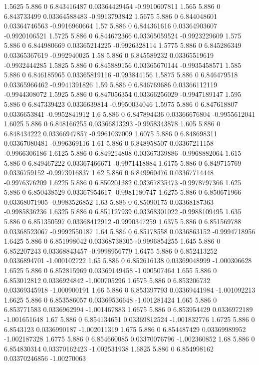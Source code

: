 {1.5625 5.886 0 6.843416487 0.03364429454 -0.9910607811
1.565 5.886 0 6.843733499 0.03364588483 -0.9913793842
1.5675 5.886 0 6.844048601 0.03364746563 -0.9916960664
1.57 5.886 0 6.844361616 0.03364903607 -0.9920106521
1.5725 5.886 0 6.844672366 0.03365059524 -0.9923229609
1.575 5.886 0 6.844980669 0.03365214225 -0.9926328114
1.5775 5.886 0 6.845286349 0.03365367619 -0.992940025
1.58 5.886 0 6.845589232 0.03365519619 -0.9932444285
1.5825 5.886 0 6.845889156 0.03365670144 -0.9935458571
1.585 5.886 0 6.846185965 0.03365819116 -0.993844156
1.5875 5.886 0 6.846479518 0.03365966462 -0.9941391826
1.59 5.886 0 6.846769686 0.03366112119 -0.9944308072
1.5925 5.886 0 6.847056354 0.03366256029 -0.9947189147
1.595 5.886 0 6.847339423 0.0336639814 -0.9950034046
1.5975 5.886 0 6.847618807 0.0336653841 -0.9952841912
1.6 5.886 0 6.847894436 0.03366676804 -0.9955612041
1.6025 5.886 0 6.848166255 0.03366813293 -0.9958343878
1.605 5.886 0 6.848434222 0.03366947857 -0.9961037009
1.6075 5.886 0 6.848698311 0.03367080481 -0.996369116
1.61 5.886 0 6.848958507 0.03367211158 -0.9966306186
1.6125 5.886 0 6.849214808 0.03367339886 -0.9968882064
1.615 5.886 0 6.849467222 0.03367466671 -0.9971418884
1.6175 5.886 0 6.849715769 0.0336759152 -0.9973916837
1.62 5.886 0 6.849960476 0.03367714448 -0.9976376209
1.6225 5.886 0 6.850201382 0.03367835473 -0.9978797366
1.625 5.886 0 6.850438529 0.03367954617 -0.9981180747
1.6275 5.886 0 6.850671966 0.03368071905 -0.9983526852
1.63 5.886 0 6.85090175 0.03368187363 -0.9985836236
1.6325 5.886 0 6.851127939 0.03368301022 -0.9988109495
1.635 5.886 0 6.851350597 0.03368412912 -0.9990347259
1.6375 5.886 0 6.851569788 0.03368523067 -0.9992550187
1.64 5.886 0 6.85178558 0.0336863152 -0.9994718956
1.6425 5.886 0 6.851998042 0.03368738305 -0.9996854255
1.645 5.886 0 6.852207243 0.03368843457 -0.9998956779
1.6475 5.886 0 6.852413252 0.0336894701 -1.000102722
1.65 5.886 0 6.852616138 0.03369048999 -1.000306628
1.6525 5.886 0 6.852815969 0.03369149458 -1.000507464
1.655 5.886 0 6.853012812 0.0336924842 -1.000705296
1.6575 5.886 0 6.853206732 0.03369345918 -1.000900191
1.66 5.886 0 6.853397793 0.03369441984 -1.001092213
1.6625 5.886 0 6.853586057 0.03369536648 -1.001281424
1.665 5.886 0 6.853771583 0.0336962994 -1.001467883
1.6675 5.886 0 6.853954429 0.0336972189 -1.001651648
1.67 5.886 0 6.854134651 0.03369812524 -1.001832776
1.6725 5.886 0 6.8543123 0.0336990187 -1.002011319
1.675 5.886 0 6.854487429 0.03369989952 -1.002187328
1.6775 5.886 0 6.854660085 0.03370076796 -1.002360852
1.68 5.886 0 6.854830314 0.03370162423 -1.002531938
1.6825 5.886 0 6.854998162 0.03370246856 -1.00270063
}

